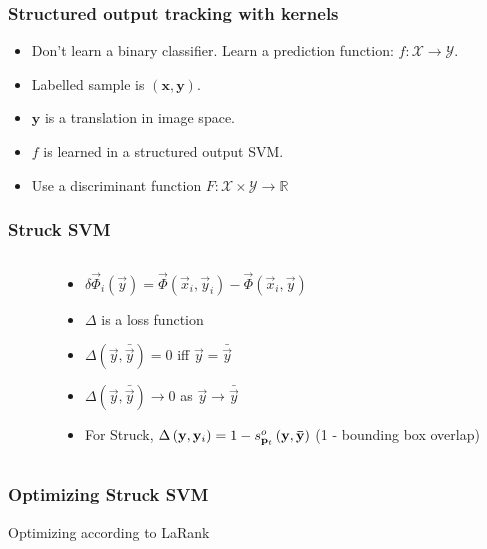 
\begin{frame}
    \frametitle{Structured output tracking with kernels \cite{6126251}}
    \begin{itemize}
        \item Don't learn a binary classifier. Learn a prediction function: \(f : \mathcal{X} \rightarrow \mathcal{Y}\).
        \item Labelled sample is \((\mathbf{x}, \mathbf{y})\).
        \item \(\mathbf{y}\) is a translation in image space.
        \item \(f\) is learned in a structured output SVM.
        \item Use a discriminant function \(F : \mathcal{X} \times \mathcal{Y} \to \mathbb{R}\)
            \struckDiscriminant
    \end{itemize}
\end{frame}

\begin{frame}
    \frametitle{Struck SVM}
    \begin{columns}[T]
        \begin{column}{0.5\textwidth}
            \struckEquation
        \end{column}
        \begin{column}{0.5\textwidth}
            \begin{itemize}
                \item \(\delta \vec{\Phi}_i \left( \vec{y} \right) = \vec{\Phi} \left( \vec{x}_i, \vec{y}_i \right) - \vec{\Phi} \left( \vec{x}_i, \vec{y} \right)\)
                \item \(\Delta\) is a loss function
                \item \(\Delta \left(\vec{y}, \bar{\vec{y}} \right) = 0\) iff \(\vec{y} =
                    \bar{\vec{y}}\)
                \item \(\Delta \left(\vec{y}, \bar{\vec{y}} \right) \to 0\) as \(\vec{y} \to
                    \bar{\vec{y}}\)
                \item For Struck, \(\Delta\left(\mathbf{y}, \mathbf{y}_i\right) = 1 - s_{\mathbf{p}_t}^o \left( \mathbf{y}, \mathbf{\bar{y}}
                    \right) \) (1 - bounding box overlap)
            \end{itemize}
        \end{column}
    \end{columns}
\end{frame}

\begin{frame}
    \frametitle{Optimizing Struck SVM}
    Optimizing according to LaRank \cite{Bordes:2007:SMS:1273496.1273508}
    \struckDualAlpha
\end{frame}

